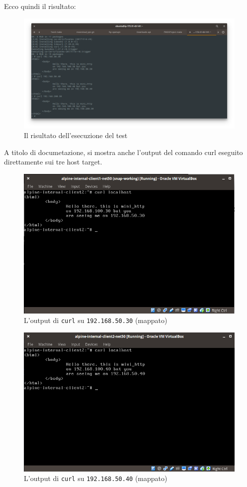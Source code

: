 Ecco quindi il risultato:
\begin{figure}[h]
  \includegraphics[scale=0.35]{img/test1-result}
  \caption{Il risultato dell'esecuzione del test}
  \label{fig:test1-result}
\end{figure}
A titolo di documetazione, si mostra anche l'output del comando curl eseguito
direttamente sui tre host target.
\begin{figure}
  \includegraphics[scale=0.4]{img/alpine-internal-client1-net50}
  \caption[Output di \texttt{curl} su target 1 in \texttt{net50}]
  {L'output di \texttt{curl} su \texttt{192.168.50.30} (mappato)}
  \label{fig:alpine-internal-client1-net50}
\end{figure}
\begin{figure}
  \includegraphics[scale=0.4]{img/alpine-internal-client2-net50}
  \caption[Output di \texttt{cur} su target 2 in \texttt{net50}]
  {L'output di \texttt{curl} su \texttt{192.168.50.40} (mappato)}
  \label{fig:alpine-internal-client2-net50}
\end{figure}
